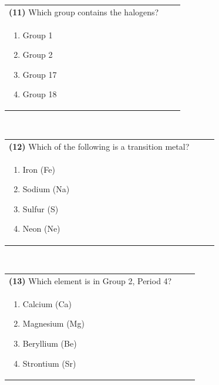 \documentclass{article}
\begin{document}
\vspace{0.5cm}
\noindent \begin{tabular}{|p{0.9\linewidth}|}
\hline
\vspace{0.2cm}
\textbf{(11)} Which group contains the halogens? \\
\begin{minipage}[t]{0.85\linewidth}
\begin{enumerate}[label=\alph*.]
\item Group 1
\item Group 2
\item Group 17
\item Group 18
\end{enumerate}
\end{minipage}\\
\hline
\end{tabular}
\\

\vspace{0.5cm}
\noindent \begin{tabular}{|p{0.9\linewidth}|}
\hline
\vspace{0.2cm}
\textbf{(12)} Which of the following is a transition metal? \\
\begin{minipage}[t]{0.85\linewidth}
\begin{enumerate}[label=\alph*.]
\item Iron (Fe)
\item Sodium (Na)
\item Sulfur (S)
\item Neon (Ne)
\end{enumerate}
\end{minipage}\\
\hline
\end{tabular}
\\
 \newpage 
\noindent \begin{tabular}{|p{0.9\linewidth}|}
\hline
\vspace{0.2cm}
\textbf{(13)} Which element is in Group 2, Period 4? \\
\begin{minipage}[t]{0.85\linewidth}
\begin{enumerate}[label=\alph*.]
\item Calcium (Ca)
\item Magnesium (Mg)
\item Beryllium (Be)
\item Strontium (Sr)
\end{enumerate}
\end{minipage}\\
\hline
\end{tabular}
\\
\end{document}
